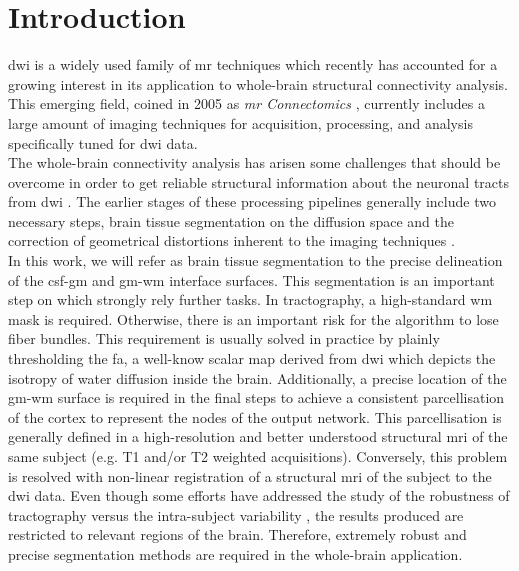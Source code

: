\section{Introduction}
\label{sec:introduction}
%
\ac{dwi} is a widely used family of \ac{mr} techniques
\citep{sundgren_diffusion_2004} which recently has accounted for a growing
interest in its application to whole-brain structural connectivity analysis.
This emerging field, coined in 2005 as \emph{\ac{mr} Connectomics}
\citep{hagmann_diffusion_2005,sporns_human_2005}, currently includes a
large amount of imaging techniques for acquisition, processing, and analysis
specifically tuned for \ac{dwi} data.\\

The whole-brain connectivity analysis has arisen some challenges
that should be overcome in order to get reliable structural information
about the neuronal tracts from \ac{dwi} \cite{johansen-berg_using_2009,
jones_white_2012}. The earlier stages of these
processing pipelines generally include two necessary steps, brain tissue
segmentation on the diffusion space and the correction of geometrical
distortions inherent to the imaging techniques \citep{hagmann_mr_2012}.\\

In this work, we will refer as brain tissue segmentation to the precise
delineation of the \ac{csf}-\ac{gm} and \ac{gm}-\ac{wm} interface surfaces.
This segmentation is an important step on which strongly rely further
tasks. In tractography, a high-standard \ac{wm} mask is required. Otherwise,
there is an important risk for the algorithm to lose fiber bundles. This
requirement is usually solved in practice by plainly thresholding the 
\ac{fa}, a well-know scalar map derived from \ac{dwi} which depicts 
the isotropy of water diffusion inside the brain. 
Additionally, a precise location of the
\ac{gm}-\ac{wm} surface is required in the final steps to
achieve a consistent parcellisation of the cortex to represent the nodes 
of the output network. This parcellisation is generally defined in a 
high-resolution and better understood structural \ac{mri} of the same 
subject (e.g. T1 and/or T2 weighted acquisitions). Conversely, this 
problem is resolved with non-linear registration of a structural \ac{mri}
of the subject to the \ac{dwi} data. Even though some efforts have addressed
the study of the robustness of tractography versus the intra-subject variability
\cite{wakana_reproducibility_2007,heiervang_between_2006}, the results produced
are restricted to relevant regions of the brain. Therefore, extremely robust
and precise segmentation methods are required in the whole-brain application. \\

